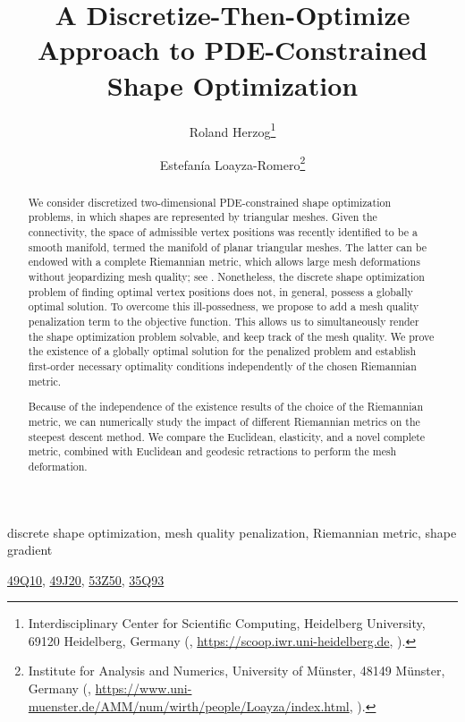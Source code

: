 \documentclass{numapde-preprint}
\title{A Discretize-Then-Optimize Approach to PDE-Constrained Shape Optimization}
\subtitle{}
\author{Roland Herzog\thanks{Interdisciplinary Center for Scientific Computing, Heidelberg University, 69120 Heidelberg, Germany (\email{roland.herzog@iwr.uni-heidelberg.de}, \url{https://scoop.iwr.uni-heidelberg.de}, \orcid{0000-0003-2164-6575}).}
\and
Estefanía Loayza-Romero\thanks{Institute for Analysis and Numerics,  University of Münster,   48149 Münster,  Germany (\email{estefania.loayza-romero@uni-muenster.de}, \url{https://www.uni-muenster.de/AMM/num/wirth/people/Loayza/index.html}, \orcid{0000-0001-7919-9259}).}}
\begin{document}
\maketitle

\begin{abstract}
We consider discretized two-dimensional PDE-constrained shape optimization problems, in which shapes are represented by triangular meshes.
Given the connectivity, the space of admissible vertex positions was recently identified to be a smooth manifold, termed the manifold of planar triangular meshes.
The latter can be endowed with a complete Riemannian metric, which allows large mesh deformations without jeopardizing mesh quality; see \cite{HerzogLoayzaRomero:2022:1}.
Nonetheless, the discrete shape optimization problem of finding optimal vertex positions does not, in general, possess a globally optimal solution.
To overcome this ill-possedness, we propose to add a mesh quality penalization term to the objective function. 
This allows us to simultaneously render the shape optimization problem solvable, and keep track of the mesh quality.
We prove the existence of a globally optimal solution for the penalized problem and establish first-order necessary optimality conditions independently of the chosen Riemannian metric.

Because of the independence of the existence results of the choice of the Riemannian metric, we can numerically study the impact of different Riemannian metrics on the steepest descent method.
We compare the Euclidean, elasticity, and a novel complete metric, combined with Euclidean and geodesic retractions to perform the mesh deformation.\end{abstract}

\begin{keywords}
discrete shape optimization, mesh quality penalization, Riemannian metric, shape gradient\end{keywords}

\begin{AMS}
\href{https://mathscinet.ams.org/msc/msc2010.html?t=49Q10}{49Q10}, \href{https://mathscinet.ams.org/msc/msc2010.html?t=49J20}{49J20}, \href{https://mathscinet.ams.org/msc/msc2010.html?t=53Z50}{53Z50}, \href{https://mathscinet.ams.org/msc/msc2010.html?t=35Q93}{35Q93}
\end{AMS}



\printbibliography
\end{document}
